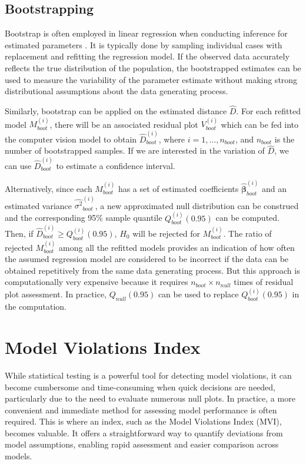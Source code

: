 \documentclass[]{interact}
\theoremstyle{plain}%
\theoremstyle{definition}
\theoremstyle{remark}
\begin{document}
\subsection{Bootstrapping}\label{bootstrapping}

Bootstrap is often employed in linear regression when conducting
inference for estimated parameters \citep[see][ and
\citet{efron1994introduction}]{davison1997bootstrap}. It is typically
done by sampling individual cases with replacement and refitting the
regression model. If the observed data accurately reflects the true
distribution of the population, the bootstrapped estimates can be used
to measure the variability of the parameter estimate without making
strong distributional assumptions about the data generating process.

Similarly, bootstrap can be applied on the estimated distance
\(\hat{D}\). For each refitted model \(M_{boot}^{(i)}\), there will be
an associated residual plot \(V_{boot}^{(i)}\) which can be fed into the
computer vision model to obtain \(\hat{D}_{boot}^{(i)}\), where
\(i = 1,...,n_{boot}\), and \(n_{boot}\) is the number of bootstrapped
samples. If we are interested in the variation of \(\hat{D}\), we can
use \(\hat{D}_{boot}^{(i)}\) to estimate a confidence interval.

Alternatively, since each \(M_{boot}^{(i)}\) has a set of estimated
coefficients \(\hat{\boldsymbol{\beta}}_{boot}^{(i)}\) and an estimated
variance \(\hat{\sigma^2}_{boot}^{(i)}\), a new approximated null
distribution can be construed and the corresponding 95\% sample quantile
\(Q_{boot}^{(i)}(0.95)\) can be computed. Then, if
\(\hat{D}_{boot}^{(i)} \geq Q_{boot}^{(i)}(0.95)\), \(H_0\) will be
rejected for \(M_{boot}^{(i)}\). The ratio of rejected
\(M_{boot}^{(i)}\) among all the refitted models provides an indication
of how often the assumed regression model are considered to be incorrect
if the data can be obtained repetitively from the same data generating
process. But this approach is computationally very expensive because it
requires \(n_{boot} \times n_{null}\) times of residual plot assessment.
In practice, \(Q_{null}(0.95)\) can be used to replace
\(Q_{boot}^{(i)}(0.95)\) in the computation.

\section{Model Violations Index}\label{sec-model-violations-index}

While statistical testing is a powerful tool for detecting model
violations, it can become cumbersome and time-consuming when quick
decisions are needed, particularly due to the need to evaluate numerous
null plots. In practice, a more convenient and immediate method for
assessing model performance is often required. This is where an index,
such as the Model Violations Index (MVI), becomes valuable. It offers a
straightforward way to quantify deviations from model assumptions,
enabling rapid assessment and easier comparison across models.
\end{document}
